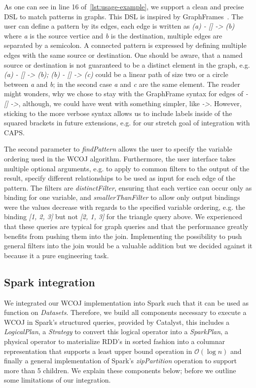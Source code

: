 As one can see in line 16 %
of~\cref{lst:usage-example}, we support a clean and precise DSL to match patterns in graphs.
This DSL is inspired by GraphFrames~\cite{graphframe}.
The user can define a pattern by its edges, each edge is written as \textit{(a) - [] -> (b)} where \textit{a} is the
source vertice and \textit{b} is the destination, multiple edges are separated by a semicolon.
A connected pattern is expressed by defining multiple edges with the same source or destination.
One should be aware, that a named source or destination is not guaranteed to be a distinct element in the graph,
e.g. \textit{(a) - [] -> (b); (b) - [] -> (c)} could be a linear path of size two or a circle between \textit{a} and
\textit{b}; in the second case \textit{a} and \textit{c} are the same element.
The reader might wonders, why we chose to stay with the GraphFrame syntax for edges of
\textit{- [] ->}, although, we could have went with something simpler, like \textit{->}.
However, sticking to the more verbose syntax allows us to include labels inside of the squared brackets
in future extensions, e.g. for our stretch goal of integration with CAPS.

The second parameter to \textit{findPattern} allows the user to specify the variable ordering used in the WCOJ algorithm.
Furthermore, the user interface takes multiple optional arguments, e.g. to apply to common filters to the output of the result,
specify different relationships to be used as input for each edge of the pattern.
The filters are \textit{distinctFilter}, ensuring that each vertice can occur only as binding for one variable, and
\textit{smallerThanFilter} to allow only output bindings were the values decrease with regards to the specified variable ordering,
e.g. the binding \textit{[1, 2, 3]} but not \textit{[2, 1, 3]} for the triangle query above.
We experienced that these queries are typical for graph queries and that the performance greatly benefits from pushing
them into the join.
Implementing the possibility to push general filters into the join would be a valuable addition but we decided against it because
it a pure engineering task.


\subsection{Spark integration}\label{subsec:spark-integration}
We integrated our WCOJ implementation into Spark such that it can be used as function on \textit{Datasets}.
Therefore, we build all components necessary to execute a WCOJ in Spark's structured queries, provided by Catalyst, this includes a
\textit{LogicalPlan},
a \textit{Strategy} to convert this logical operator into a \textit{SparkPlan}, a physical operator to materialize
RDD's in sorted fashion into a columnar representation that supports a least upper bound operation in $\mathcal{O} (\log n)$ and
finally a general implementation of Spark's \textit{zipPartition} operation to support more than 5 children.
We explain these components below; before we outline some limitations of our integration.

